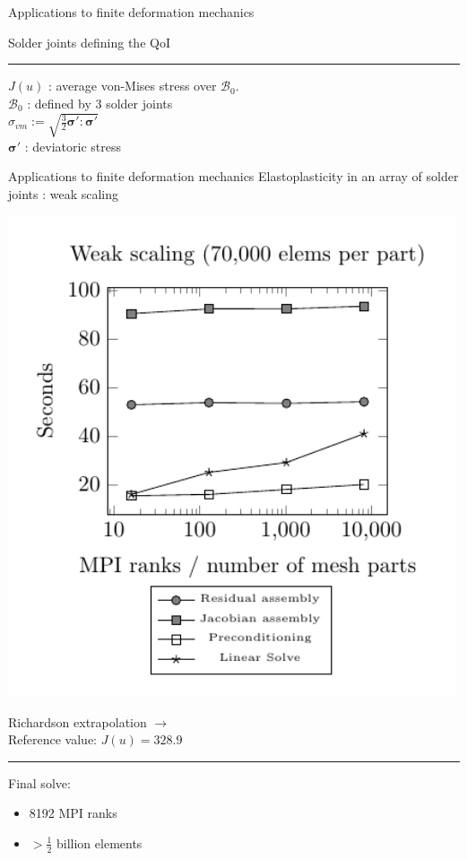 \documentclass[fleqn]{beamer}
\newcommand{\bs}[1]{\boldsymbol{#1}}
\begin{document}
\begin{frame}{Applications to finite deformation mechanics}
\begin{minipage}{0.5\textwidth}
\begin{figure}
\end{figure}
Solder joints defining the QoI \\ 
\hrule
\vspace{1em}
$J(u)$ : average von-Mises stress over $\mathcal{B}_0$. \\
$\mathcal{B}_0$ : defined by 3 solder joints \\
$\sigma_{vm} := \sqrt{\frac32 \bs{\sigma}' : \bs{\sigma}'}$ \\
$\bs{\sigma}'$ : deviatoric stress
\end{minipage}
\end{frame}


\begin{frame}{Applications to finite deformation mechanics}
{Elastoplasticity in an array of solder joints : weak scaling}
\begin{minipage}{0.5\textwidth}
\centering
\includegraphics[width=0.99\textwidth]{../img/aut_weak_scaling}
\end{minipage}%
\begin{minipage}{0.5\textwidth}
Richardson extrapolation $\rightarrow$ \\
Reference value: $J(u) = 328.9$ \\
\vspace{0.5em}
\hrule
\vspace{1em}
Final solve:
\begin{itemize}
\item 8192 MPI ranks
\item $> \frac12$ billion elements
\end{itemize}
\end{minipage}
\end{frame}
\end{document}
